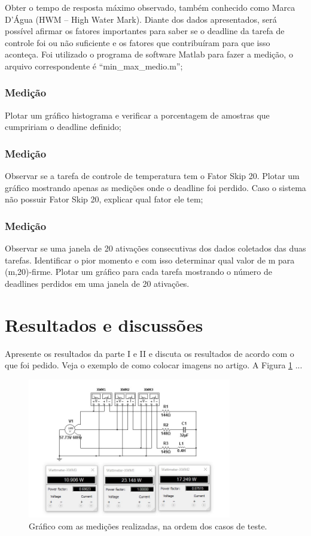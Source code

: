 \documentclass[journal]{IEEEtran}
\begin{document}
Obter o tempo de resposta máximo observado, também conhecido como Marca D’Água (HWM – High Water Mark). Diante dos dados apresentados, será possível afirmar os fatores importantes para saber se o deadline da tarefa de controle foi ou não suficiente e os fatores que contribuíram para que isso aconteça. Foi utilizado o programa de software Matlab para fazer a medição, o arquivo correspondente é “min\_max\_medio.m”;

\subsubsection{Medição}

Plotar um gráfico histograma e verificar a porcentagem de amostras que cumpririam o deadline definido;

\subsubsection{Medição}

Observar se a tarefa de controle de temperatura tem o Fator Skip 20. Plotar um gráfico mostrando apenas as medições onde o deadline foi perdido. Caso o sistema não possuir Fator Skip 20, explicar qual fator ele tem;

\subsubsection{Medição}

Observar se uma janela de 20 ativações consecutivas dos dados coletados das duas tarefas. Identificar o pior momento e com isso determinar qual valor de m para (m,20)-firme. Plotar um gráfico para cada tarefa mostrando o número de deadlines perdidos em uma janela de 20 ativações.


\section{Resultados e discussões}

Apresente os resultados da parte I e II e discuta os resultados de acordo com o que foi pedido. Veja o exemplo de como colocar imagens no artigo. A Figura \ref{fig1} ...

	\begin{figure}[h]
	\centering
	\includegraphics[width=3.5in]{Imagens/medidas.jpg}	
	\caption{Gráfico com as medições realizadas, na ordem dos casos de teste.}
	\label{fig1}
\end{figure}
\end{document}
